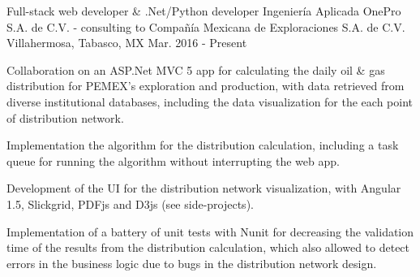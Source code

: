 


\begin{cventries}


\cventry
{Full-stack web developer \& .Net/Python developer} %
{Ingeniería Aplicada OnePro S.A. de C.V. - consulting to Compañía Mexicana de Exploraciones S.A. de C.V.} %
{Villahermosa, Tabasco, MX} %
{Mar. 2016 - Present} %
{ %
\begin{cvitems}
	\item{Collaboration on an ASP.Net MVC 5 app for calculating the daily oil \& gas distribution for PEMEX's exploration and production, with data retrieved from diverse institutional databases, including the data visualization for the each point of distribution network.}
	\item{Implementation the algorithm for the distribution calculation, including a task queue for running the algorithm without interrupting the web app.}
	\item{Development of the UI for the distribution network visualization, with Angular 1.5, Slickgrid, PDFjs and D3js {\tiny (see side-projects)}.}
	\item {Implementation of a battery of unit tests with Nunit for decreasing the validation time of the results from the distribution calculation, which also allowed to detect errors in the business logic due to bugs in the distribution network design.}
\end{cvitems}
}



\end{cventries}
